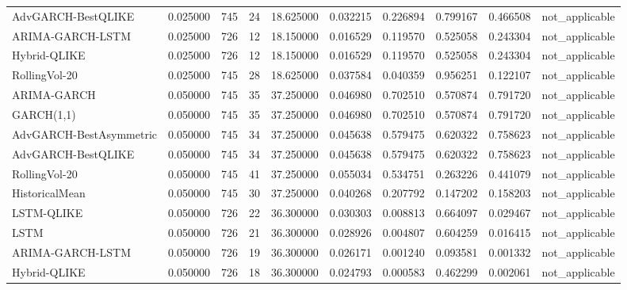 \begin{tabular}{l r r r r r r r r l}
AdvGARCH-BestQLIKE & 0.025000 & 745 & 24 & 18.625000 & 0.032215 & 0.226894 & 0.799167 & 0.466508 & not\_applicable \\
ARIMA-GARCH-LSTM & 0.025000 & 726 & 12 & 18.150000 & 0.016529 & 0.119570 & 0.525058 & 0.243304 & not\_applicable \\
Hybrid-QLIKE & 0.025000 & 726 & 12 & 18.150000 & 0.016529 & 0.119570 & 0.525058 & 0.243304 & not\_applicable \\
RollingVol-20 & 0.025000 & 745 & 28 & 18.625000 & 0.037584 & 0.040359 & 0.956251 & 0.122107 & not\_applicable \\
ARIMA-GARCH & 0.050000 & 745 & 35 & 37.250000 & 0.046980 & 0.702510 & 0.570874 & 0.791720 & not\_applicable \\
GARCH(1,1) & 0.050000 & 745 & 35 & 37.250000 & 0.046980 & 0.702510 & 0.570874 & 0.791720 & not\_applicable \\
AdvGARCH-BestAsymmetric & 0.050000 & 745 & 34 & 37.250000 & 0.045638 & 0.579475 & 0.620322 & 0.758623 & not\_applicable \\
AdvGARCH-BestQLIKE & 0.050000 & 745 & 34 & 37.250000 & 0.045638 & 0.579475 & 0.620322 & 0.758623 & not\_applicable \\
RollingVol-20 & 0.050000 & 745 & 41 & 37.250000 & 0.055034 & 0.534751 & 0.263226 & 0.441079 & not\_applicable \\
HistoricalMean & 0.050000 & 745 & 30 & 37.250000 & 0.040268 & 0.207792 & 0.147202 & 0.158203 & not\_applicable \\
LSTM-QLIKE & 0.050000 & 726 & 22 & 36.300000 & 0.030303 & 0.008813 & 0.664097 & 0.029467 & not\_applicable \\
LSTM & 0.050000 & 726 & 21 & 36.300000 & 0.028926 & 0.004807 & 0.604259 & 0.016415 & not\_applicable \\
ARIMA-GARCH-LSTM & 0.050000 & 726 & 19 & 36.300000 & 0.026171 & 0.001240 & 0.093581 & 0.001332 & not\_applicable \\
Hybrid-QLIKE & 0.050000 & 726 & 18 & 36.300000 & 0.024793 & 0.000583 & 0.462299 & 0.002061 & not\_applicable \\
\hline
\end{tabular}
